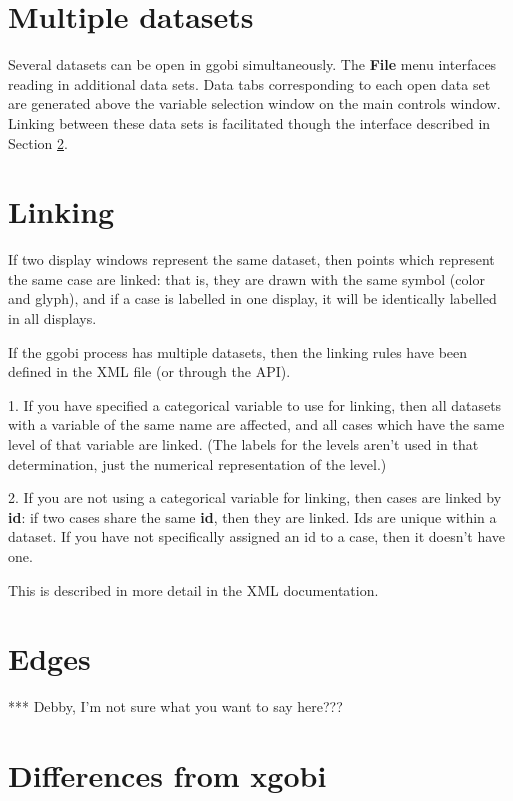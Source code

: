 \documentclass[11pt]{article}
\begin{document}
%
%

\section{Multiple datasets}

Several datasets can be open in ggobi simultaneously. The {\bf File}
menu interfaces reading in additional data sets. Data tabs
corresponding to each open data set are generated above the variable
selection window on the main controls window. Linking between these
data sets is facilitated though the interface described in Section
\ref{LinkingRules}.

\section{Linking}
\label{LinkingRules}

If two display windows represent the same dataset, then points which
represent the same case are linked:  that is, they are drawn with the
same symbol (color and glyph), and if a case is labelled in one
display, it will be identically labelled in all displays.

If the ggobi process has multiple datasets, then the linking rules
have been defined in the XML file (or through the API).

1.  If you have specified a categorical variable to use for linking,
then all datasets with a variable of the same name are affected, and
all cases which have the same level of that variable are linked.
(The labels for the levels aren't used in that determination, just
the numerical representation of the level.)

2.  If you are not using a categorical variable for linking, then
cases are linked by {\bf id}: if two cases share the same {\bf id},
then they are linked.   Ids are unique within a dataset.  If you have
not specifically assigned an id to a case, then it doesn't have one.

This is described in more detail in the XML documentation.

\section{Edges}

*** Debby, I'm not sure what you want to say here???

\newpage
\section{Differences from xgobi}
\label{slbl:xgobi}
\end{document}
